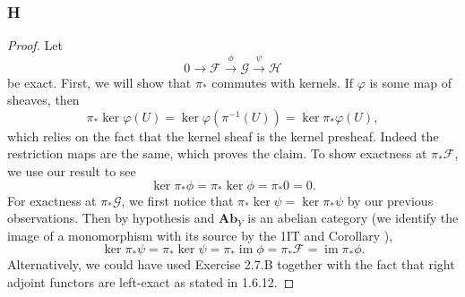 \documentclass{article}
\newcommand{\fF}{\mathscr{F}}
\newcommand{\fG}{\mathscr{G}}
\newcommand{\fH}{\mathscr{H}}
\DeclareMathOperator{\im}{im}
\newcommand{\Ab}{\mathbf{Ab}} %
\begin{document}
\subsubsection{H}\label{2.6.H}
\begin{proof}
    Let
    \[
    0\to \fF \xrightarrow{\phi} \fG \xrightarrow{\psi} \fH
    \]
    be exact. First, we will show that $\pi_*$ commutes with kernels. If $\varphi$ is some map of sheaves, then
    \[
    \pi_* \ker \varphi (U) = \ker \varphi (\pi^{-1}(U)) = \ker \pi_* \varphi(U),
    \]
    which relies on the fact that the kernel sheaf is the kernel presheaf. Indeed the restriction maps are the same, which proves the claim. To show exactness at $\pi_* \fF$, we use our result to see
    \[
    \ker \pi_* \phi = \pi_* \ker \phi = \pi_* 0 = 0.
    \]
    For exactness at $\pi_* \fG$, we first notice that $\pi_* \ker \psi = \ker \pi_* \psi$ by our previous observations. Then by hypothesis and $\Ab_Y$ is an abelian category (we identify the image of a monomorphism with its source by the 1IT and Corollary %
    ),
    \[
    \ker \pi_* \psi = \pi_* \ker \psi = \pi_* \im \phi = \pi_* \fF = \im \pi_* \phi.
    \]
    Alternatively, we could have used Exercise 2.7.B  together with the fact that right adjoint functors are left-exact as stated in 1.6.12.
\end{proof}
\end{document}
